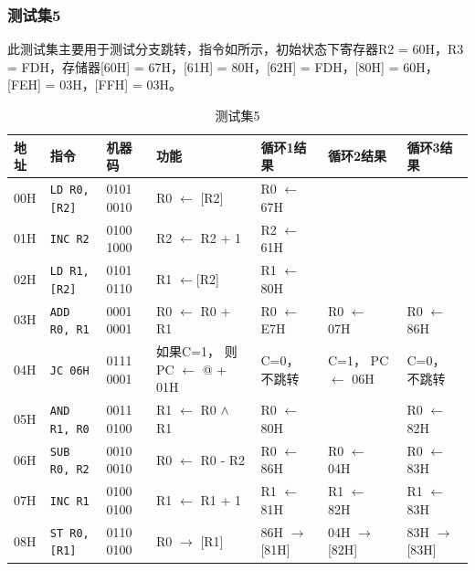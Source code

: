 \documentclass[lang=cn,11pt,a4paper,cite=authornum]{paper}
\begin{document}
\subsubsection{测试集5}

此测试集主要用于测试分支跳转，指令如所示，初始状态下寄存器R2 = 60H，R3 = FDH，存储器[60H] = 67H，[61H] = 80H，[62H] = FDH，[80H] = 60H，[FEH] = 03H，[FFH] = 03H。

\begin{table}[!htbp]
    \centering
    
    \caption{测试集5\label{tab:base_test_5}}
    
    \begin{tabular}{|l|l|l|l|l|l|l|}
        \hline 
		地址 & 指令 & 机器码 & 功能 & 循环1结果 & 循环2结果 & 循环3结果 \\ \hline 
		00H & \texttt{LD R0, [R2]} & 0101 0010 & R0 $\leftarrow$ [R2] & R0 $\leftarrow$ 67H &  &  \\ \hline 
		01H & \texttt{INC R2} & 0100 1000 & R2 $\leftarrow$ R2 + 1 & R2 $\leftarrow$ 61H &  &  \\ \hline 
		02H & \texttt{LD R1, [R2]} & 0101 0110 & R1 $\leftarrow $[R2]  & R1 $\leftarrow$ 80H &  &  \\ \hline 
		03H & \texttt{ADD R0, R1} & 0001 0001 & R0 $\leftarrow$ R0 + R1 & R0 $\leftarrow$ E7H & R0 $\leftarrow$ 07H & R0 $\leftarrow$ 86H \\ \hline 
		04H & \texttt{JC 06H} & 0111 0001 & \makecell[l]{如果C=1，\\则PC $\leftarrow$ @ + 01H} & \makecell[l]{C=0，\\不跳转} & \makecell[l]{C=1，\\PC $\leftarrow$ 06H} & \makecell[l]{C=0，\\不跳转} \\ \hline 
		05H & \texttt{AND R1, R0} & 0011 0100 & R1 $\leftarrow$ R0 $\wedge$ R1 & R0 $\leftarrow$ 80H &  & R0 $\leftarrow$ 82H \\ \hline 
		06H & \texttt{SUB R0, R2} & 0010 0010 & R0 $\leftarrow$ R0 - R2 & R0 $\leftarrow$ 86H & R0 $\leftarrow$ 04H & R0 $\leftarrow$ 83H \\ \hline 
		07H & \texttt{INC R1} & 0100 0100 & R1 $\leftarrow$ R1 + 1 & R1 $\leftarrow$ 81H & R1 $\leftarrow$ 82H & R1 $\leftarrow$ 83H \\ \hline 
		08H & \texttt{ST R0, [R1]} & 0110 0100 & R0 $\rightarrow$ [R1] & 86H $\rightarrow$ [81H] & 04H $\rightarrow$ [82H] & 83H $\rightarrow$ [83H] \\ \hline 

\end{tabular}
\end{table}
\end{document}
